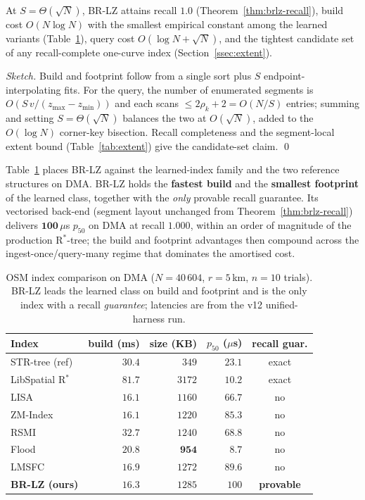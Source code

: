 \begin{proposition}\label{prop:pareto}
At $S=\Theta(\sqrt N)$, BR-LZ attains recall $1.0$
(Theorem~\ref{thm:brlz-recall}), build cost $O(N\log N)$ with the smallest
empirical constant among the learned variants
(Table~\ref{tab:pareto}), query cost $O(\log N+\sqrt N)$, and the
tightest candidate set of any recall-complete one-curve index
(Section~\ref{ssec:extent}).
\end{proposition}
\begin{proof}[Sketch]
Build and footprint follow from a single sort plus $S$ endpoint-interpolating
fits. For the query, the number of enumerated segments is
$O(S\,v/(z_{\max}\!-\!z_{\min}))$ and each scans $\le\!2\rho_k\!+\!2\!=\!O(N/S)$
entries; summing and setting $S=\Theta(\sqrt N)$ balances the two at
$O(\sqrt N)$, added to the $O(\log N)$ corner-key bisection. Recall
completeness and the segment-local extent bound (Table~\ref{tab:extent})
give the candidate-set claim. \qed
\end{proof}

Table~\ref{tab:pareto} places BR-LZ against
the learned-index family and the two reference structures on DMA. BR-LZ
holds the \textbf{fastest build} and the \textbf{smallest footprint} of
the learned class, together with the \emph{only} provable recall
guarantee.  Its vectorised back-end (segment layout unchanged from Theorem~\ref{thm:brlz-recall}) delivers $\mathbf{100}$\,$\mu$s $p_{50}$ on DMA at recall $1.000$, within an order of magnitude of the production R$^{*}$-tree; the build and footprint advantages then compound across the ingest-once/query-many regime that dominates the amortised cost.

\begin{table}[t]
\centering
\caption{OSM index comparison on DMA ($N{=}40\,604$, $r{=}5$\,km,
$n{=}10$ trials). BR-LZ leads the learned class on build and footprint
and is the only index with a recall \emph{guarantee}; latencies are from the v12 unified-harness run.}\label{tab:pareto}
\small
\begin{tabular}{lrrrc}
\toprule
Index & build (ms) & size (KB) & $p_{50}$ ($\mu$s) & recall guar. \\
\midrule
STR-tree (ref)     & $30.4$ &  $349$  & $23.1$ & exact \\
LibSpatial R$^*$   & $81.7$ & $3172$  & $\mathbf{10.2}$ & exact \\
LISA               & $16.1$ & $1160$  & $66.7$ & no \\
ZM-Index           & $16.1$ & $1220$  & $85.3$ & no \\
RSMI               & $32.7$ & $1240$  & $68.8$ & no \\
Flood~\cite{nathan2020flood} & $20.8$ & $\mathbf{954}$  & $\mathbf{8.7}$  & no \\
LMSFC~\cite{gao2022lmsfc}    & $16.9$ & $1272$  & $89.6$ & no \\
\textbf{BR-LZ (ours)} & $\mathbf{16.3}$ & $1285$ & $100$ & \textbf{provable} \\
\bottomrule
\end{tabular}
\end{table}

